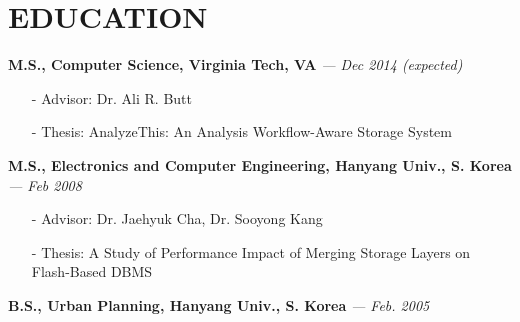 \section{EDUCATION}
\vspace{0.03in} 
{\bf M.S., Computer Science, Virginia Tech, VA}
{\footnotesize{\it --- Dec 2014 (expected)}}
\begin{itemize}[leftmargin=*]
\setlength\itemsep{-0.02in}
  \item[-] {\small Advisor: Dr. Ali R. Butt}
  \item[-] {\small Thesis: AnalyzeThis: An Analysis Workflow-Aware Storage System}
\end{itemize}
\vspace{-0.15in}
{\bf M.S., Electronics and Computer Engineering, Hanyang Univ., S. Korea}
{\footnotesize{\it --- Feb 2008}}
\begin{itemize}[leftmargin=*]
\setlength\itemsep{-0.02in}
  \item[-] {\small Advisor: Dr. Jaehyuk Cha, Dr. Sooyong Kang}
  \item[-] {\small Thesis: A Study of Performance Impact of Merging Storage Layers on
  Flash-Based DBMS}
\end{itemize}
\vspace{-0.15in}
{\bf B.S., Urban Planning, Hanyang Univ., S. Korea}
{\footnotesize{\it --- Feb. 2005}}

